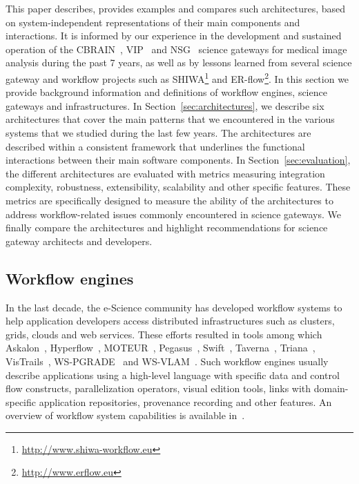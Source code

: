 \documentclass[preprint,3p,twocolumn]{elsarticle}
\begin{document}
This paper describes, provides examples and compares such
architectures, based on system-independent representations of their
main components and interactions. It is informed
 by our experience in the development and
sustained operation of the CBRAIN~\cite{SHER-14},
VIP~\cite{GLAT-13} and NSG~\cite{shahand2015data,shahand:2012jgc} science gateways for medical image analysis during
the past 7 years, as well as by lessons learned from several science
gateway and workflow projects such as
SHIWA\footnote{\url{http://www.shiwa-workflow.eu}} and
ER-flow\footnote{\url{http://www.erflow.eu}}.  In this section we
provide background information and definitions of workflow engines,
science gateways and infrastructures. In
Section~\ref{sec:architectures}, we describe six architectures
 that cover
the main patterns that we encountered in the various systems that we
studied during the last few years. The architectures are described
within a consistent framework that underlines the functional
interactions between their main software components. In
Section~\ref{sec:evaluation}, the different architectures are
evaluated with metrics measuring integration complexity, robustness,
extensibility, scalability and other specific features. These metrics
are specifically designed to measure the ability of the architectures
to address workflow-related issues commonly encountered in science
gateways. We finally compare the architectures and highlight
recommendations for science gateway architects and 
developers.

\subsection{Workflow engines}

\label{sec:introduction-engines}
In the last decade, the e-Science community has developed workflow
systems to help application developers access distributed
infrastructures such as clusters, grids, clouds and web
services. These efforts resulted in tools among which
Askalon~\cite{fahringer2005askalon},
Hyperflow~\cite{balis2016hyperflow}, MOTEUR~\cite{GLAT-08i},
Pegasus~\cite{deelman2005pegasus,Deelman201517},
Swift~\cite{zhao2007swift}, Taverna~\cite{oinn2004taverna},
Triana~\cite{taylor2007triana}, VisTrails~\cite{callahan2006managing},
WS-PGRADE~\cite{Kacsuk2012} and
WS-VLAM~\cite{wsvlam}.  Such workflow engines usually describe
applications using a high-level language with specific data and control
flow constructs, parallelization operators, visual edition tools,
links with domain-specific application repositories, provenance
recording and other features. An overview of workflow system
capabilities is available in~\cite{deelman2009workflows}.
\end{document}
